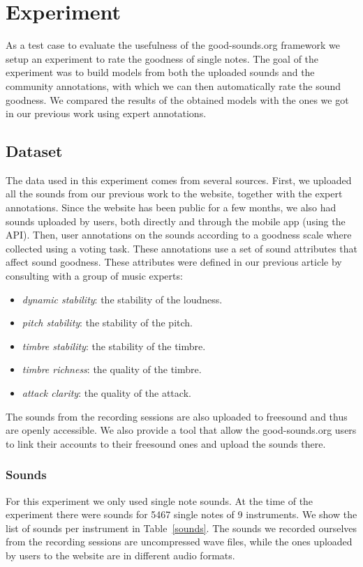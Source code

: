 \documentclass{article}
\begin{document}
\section{Experiment} \label{experiment}
As a test case to evaluate the usefulness of the good-sounds.org framework we setup an experiment to rate the goodness of single notes. The goal of the experiment was to build models from both the uploaded sounds and the community annotations, with which we can then automatically rate the sound goodness. We compared the results of the obtained models with the ones we got in our previous work using expert annotations.  

\subsection{Dataset}
The data used in this experiment comes from several sources. First, we uploaded all the sounds from our previous work to the website, together with the expert annotations. Since the website has been public for a few months, we also had  sounds uploaded by users, both directly and through the mobile app (using the API). Then, user annotations on the sounds according to a goodness scale where collected using a voting task. These annotations use a set of sound attributes that affect sound goodness. These attributes were defined in our previous article \cite{01} by consulting with a group of music experts:   
\begin{itemize}
	\item{\textit{dynamic stability}: the stability of the loudness.}
	\item{\textit{pitch stability}: the stability of the pitch.}
	\item{\textit{timbre stability}: the stability of the timbre.}
	\item{\textit{timbre richness}: the quality of the timbre.}
	\item{\textit{attack clarity}: the quality of the attack.}
\end{itemize}
The sounds from the recording sessions are also uploaded to freesound and thus are openly accessible. We also provide a tool that allow the good-sounds.org users to link their accounts to their freesound ones and upload the sounds there.  

\subsubsection{Sounds}
For this experiment we only used single note sounds. At the time of the experiment there were sounds for 5467 single notes of 9 instruments. We show the list of sounds per instrument in Table~\ref{sounds}. The sounds we recorded ourselves from the recording sessions are uncompressed wave files, while the ones uploaded by users to the website are in different audio formats.  
\end{document}
